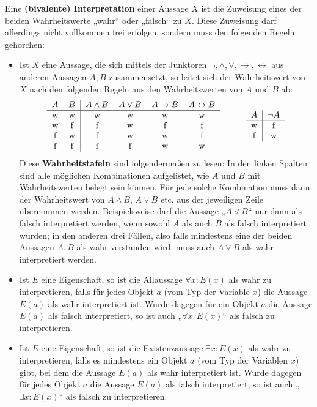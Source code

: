 \begin{defin}[Interpretation] \label{def:interpretation}  
    Eine \textbf{(bivalente) Interpretation} einer Aussage $X$ ist die Zuweisung eines der beiden Wahrheitswerte „wahr“ oder „falsch“ zu $X$. Diese Zuweisung darf allerdings nicht vollkommen frei erfolgen, sondern muss den folgenden Regeln gehorchen:
    \begin{itemize}
        \item  Ist $X$ eine Aussage, die sich mittels der Junktoren $\neg,\land,\lor,\to,\leftrightarrow$ aus anderen Aussagen $A,B$ zusammensetzt, so leitet sich der Wahrheitswert von $X$ nach den folgenden Regeln aus den Wahrheitswerten von $A$ und $B$ ab:
        \[\begin{tabular}{cc|cccc}
            $A$ & $B$  & $A\land B$ & $A\lor B$ & $A\to B$ & $A\leftrightarrow B$ \\
            \hline
            w&w& w & w & w & w \\
            w&f& f & w & f & f \\
            f&w& f & w & w & f \\
            f&f& f & f & w & w
        \end{tabular} \qquad\quad \begin{tabular}{c|c}
            $A$ & $\neg A$ \\
            \hline
            w& f \\
            f& w
        \end{tabular}\]
        Diese \textbf{Wahrheitstafeln} sind folgendermaßen zu lesen: In den linken Spalten sind alle möglichen Kombinationen aufgelistet, wie $A$ und $B$ mit Wahrheitswerten belegt sein können. Für jede solche Kombination muss dann der Wahrheitswert von $A\land B$, $A\lor B$ etc. aus der jeweiligen Zeile übernommen werden. Beispielsweise darf die Aussage „$A\lor B$“ nur dann als falsch interpretiert werden, wenn sowohl $A$ als auch $B$ als falsch interpretiert wurden; in den anderen drei Fällen, also falls mindestens eine der beiden Aussagen $A,B$ als wahr verstanden wird, muss auch $A\lor B$ als wahr interpretiert werden.
        \item Ist $E$ eine Eigenschaft, so ist die Allaussage $\forall x: E(x)$ als wahr zu interpretieren, falls für jedes Objekt $a$ (vom Typ der Variable $x$) die Aussage $E(a)$ als wahr interpretiert ist. Wurde dagegen für ein Objekt $a$ die Aussage $E(a)$ als falsch interpretiert, so ist auch „$\forall x: E(x)$“ als falsch zu interpretieren.
        \item Ist $E$ eine Eigenschaft, so ist die Existenzaussage $\exists x: E(x)$ als wahr zu interpretieren, falls es mindestens ein Objekt $a$ (vom Typ der Variablen $x$) gibt, bei dem die Aussage $E(a)$ als wahr interpretiert ist. Wurde dagegen für jedes Objekt $a$ die Aussage $E(a)$ als falsch interpretiert, so ist auch „$\exists x: E(x)$“ als falsch zu interpretieren.
    \end{itemize}
\end{defin}



